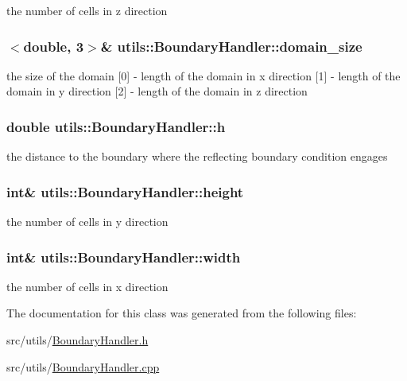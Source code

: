 the number of cells in z direction \hypertarget{classutils_1_1BoundaryHandler_aa8e0deffc1f066d33470a90ff04ec451}{
\subsubsection[{domain\-\_\-size}]{$<$double, 3$>$\& utils\-::\-Boundary\-Handler\-::domain\-\_\-size\hspace{0.3cm}{\ttfamily [private]}}}\label{classutils_1_1BoundaryHandler_aa8e0deffc1f066d33470a90ff04ec451}
the size of the domain \mbox{[}0\mbox{]} -\/ length of the domain in x direction \mbox{[}1\mbox{]} -\/ length of the domain in y direction \mbox{[}2\mbox{]} -\/ length of the domain in z direction \hypertarget{classutils_1_1BoundaryHandler_a14bda6e1d4f8514626a170cd105f8e61}{
\subsubsection[{h}]{\setlength{\rightskip}{0pt plus 5cm}double utils\-::\-Boundary\-Handler\-::h\hspace{0.3cm}{\ttfamily [private]}}}\label{classutils_1_1BoundaryHandler_a14bda6e1d4f8514626a170cd105f8e61}
the distance to the boundary where the reflecting boundary condition engages \hypertarget{classutils_1_1BoundaryHandler_a84cbe858f08cb4bafd4af86af5610567}{
\subsubsection[{height}]{\setlength{\rightskip}{0pt plus 5cm}int\& utils\-::\-Boundary\-Handler\-::height\hspace{0.3cm}{\ttfamily [private]}}}\label{classutils_1_1BoundaryHandler_a84cbe858f08cb4bafd4af86af5610567}
the number of cells in y direction \hypertarget{classutils_1_1BoundaryHandler_ad3fceed36277f905d4bc159614831f2a}{
\subsubsection[{width}]{\setlength{\rightskip}{0pt plus 5cm}int\& utils\-::\-Boundary\-Handler\-::width\hspace{0.3cm}{\ttfamily [private]}}}\label{classutils_1_1BoundaryHandler_ad3fceed36277f905d4bc159614831f2a}
the number of cells in x direction 

The documentation for this class was generated from the following files\-:\begin{DoxyCompactItemize}
\item 
src/utils/\hyperlink{BoundaryHandler_8h}{Boundary\-Handler.\-h}\item 
src/utils/\hyperlink{BoundaryHandler_8cpp}{Boundary\-Handler.\-cpp}\end{DoxyCompactItemize}
